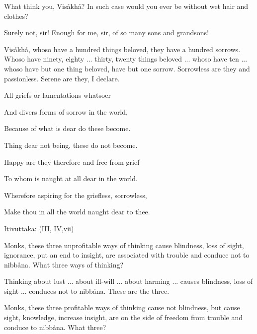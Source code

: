 \documentclass[12pt,twoside]{article}
\begin{document}
{\textasciigrave}What think you, Vis{\aa}kh{\aa}? In such case would you
ever be without wet hair and clothes?

{\textasciigrave}Surely not, sir! Enough for me, sir, of so many sons
and grandsons!

{\textasciigrave}Vis{\aa}kh{\aa}, whoso have a hundred things beloved,
they have a hundred sorrows. Whoso have ninety, eighty ... thirty,
twenty things beloved ... whoso have ten ... whoso have but one thing
beloved, have but one sorrow. Sorrowless are they and passionless.
Serene are they, I declare.{\textquotesingle}


\bigskip


\bigskip


\bigskip


\bigskip


\bigskip


\bigskip


\bigskip


\bigskip


\bigskip

All griefs or lamentations whatso{\textquotesingle}er

And divers forms of sorrow in the world, 

Because of what is dear do these become.

Thing dear not being, these do not become.

Happy are they therefore and free from grief

To whom is naught at all dear in the world.

Wherefore aspiring for the griefless, sorrowless,

Make thou in all the world naught dear to thee.

\clearpage
Itivuttaka: (III, IV,vii)


\bigskip

{\textasciigrave}Monks, these three unprofitable ways of thinking cause
blindness, loss of sight, ignorance, put an end to insight, are
associated with trouble and conduce not to nibb{\aa}na. What three ways
of thinking?

Thinking about lust ... about ill{}-will ... about harming ... causes
blindness, loss of sight ... conduces not to nibb{\aa}na. These are the
three.

{\textasciigrave}Monks, these three profitable ways of thinking cause
not blindness, but cause sight, knowledge, increase insight, are on the
side of freedom from trouble and conduce to nibb{\aa}na. What three?
\end{document}
